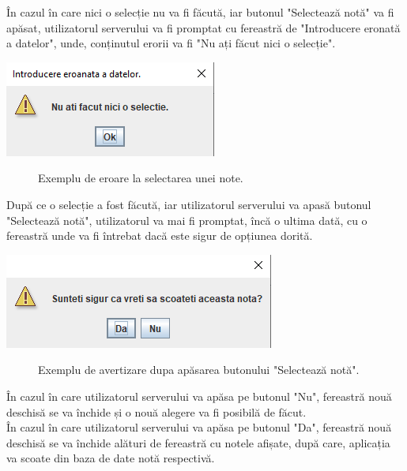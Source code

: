 \documentclass{article}
\begin{document}
		În cazul în care nici o selecție nu va fi făcută, iar butonul "Selectează notă" va fi apăsat, utilizatorul serverului va fi promptat cu fereastră de "Introducere eronată a datelor", unde, conținutul erorii va fi "Nu ați făcut nici o selecție".

	\begin{center}
		\includegraphics[scale=0.8]{Source/ServerScoateEroare2}
		\begin{figure}[!h]
			{\caption*{Exemplu de eroare la selectarea unei note.}}
		\end{figure}
	\end{center}

		După ce o selecție a fost făcută, iar utilizatorul serverului va apasă butonul "Selectează notă", utilizatorul va mai fi promptat, încă o ultima dată, cu o fereastră unde va fi întrebat dacă este sigur de opțiunea dorită.\\

	\begin{center}
		\includegraphics[scale=0.8]{Source/ServerScoateListaPrompt}
		\begin{figure}[!h]
			{\caption*{Exemplu de avertizare dupa apăsarea butonului "Selectează notă".}}
		\end{figure}
	\end{center}

		În cazul în care utilizatorul serverului va apăsa pe butonul "Nu", fereastră nouă deschisă se va închide și o nouă alegere va fi posibilă de făcut.\\

		În cazul în care utilizatorul serverului va apăsa pe butonul "Da", fereastră nouă deschisă se va închide alături de fereastră cu notele afișate, după care, aplicația va scoate din baza de date notă respectivă.  \\
\end{document}
